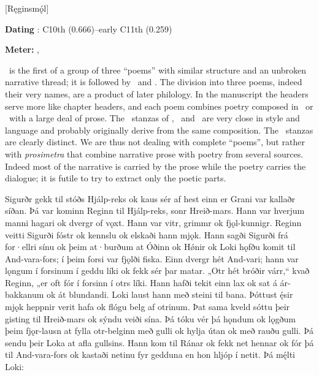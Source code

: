 [Ręginsmǫ́l]

\begin{flushright}%
\textbf{Dating} \parencite{Sapp2022}: C10th (0.666)–early C11th (0.259)

\textbf{Meter:} \Ljodahattr, \Fornyrdislag%
\end{flushright}

\Reginsmal\ is the first of a group of three “poems” with similar structure and an unbroken narrative thread; it is followed by \Fafnismal\ and \Sigrdrifumal.  The division into three poems, indeed their very names, are a product of later philology.  In the manuscript the headers serve more like chapter headers, and each poem combines poetry composed in \Ljodahattr\ or \Fornyrdislag\ with a large deal of prose.  The \Ljodahattr\ stanzas of \Reginsmal, \Fafnismal\ and \Sigrdrifumal\ are very close in style and language and probably originally derive from the same composition.  The \Fornyrdislag\ stanzas are clearly distinct.  We are thus not dealing with complete “poems”, but rather with \emph{prosimetra} that combine narrative prose with poetry from several sources.  Indeed most of the narrative is carried by the prose while the poetry carries the dialogue; it is futile to try to extract only the poetic parts.

\sectionline

\bpg\bpa Sigurðr gekk til stóðs Hjálp-reks ok kaus sér af hest einn er Grani var kallaðr síðan. Þá var kominn Reginn til Hjálp-reks, sonr Hreið-mars. Hann var hverjum manni hagari ok dvergr of vǫxt. Hann var vitr, grimmr ok fjǫl-kunnigr. Reginn veitti Sigurði fóstr ok kennslu ok elskaði hann mjǫk. Hann sagði Sigurði frá for·ellri sínu ok þeim at·burðum at Óðinn ok Hǿnir ok Loki hǫfðu komit til And-vara-fors; í þeim forsi var fjǫlði fiska. Einn dvergr hét And-vari; hann var lǫngum í forsinum í geddu líki ok fekk sér þar matar. „Otr hét bróðir várr,“ kvað Reginn, „er oft fór í forsinn í otrs líki. Hann hafði tekit einn lax ok sat á ár-bakkanum ok át blundandi. Loki laust hann með steini til bana. Þóttust ę́sir mjǫk heppnir verit hafa ok flógu belg af otrinum. Þat sama kveld sóttu þeir gisting til Hreið-mars ok sýndu veiði sína. Þá tóku vér þá hǫndum ok lǫgðum þeim fjǫr-lausn at fylla otr-belginn með gulli ok hylja útan ok með rauðu gulli. Þá sendu þeir Loka at afla gullsins. Hann kom til Ránar ok fekk net hennar ok fór þá til And-vara-fors ok kastaði netinu fyr gedduna en hon hljóp í netit. Þá mę́lti Loki:\epa

